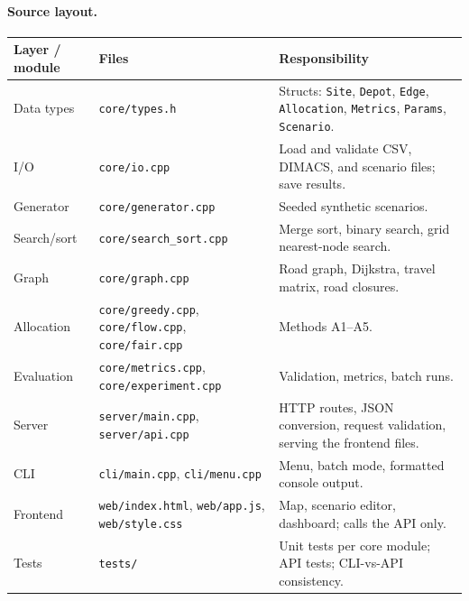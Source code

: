 \documentclass[11pt]{article}
\begin{document}
\paragraph{Source layout.}
\begin{center}
\small
\begin{tabularx}{\textwidth}{@{}l l X@{}}
\toprule
\textbf{Layer / module} & \textbf{Files} & \textbf{Responsibility}\\
\midrule
Data types & \texttt{core/types.h} & Structs: \texttt{Site}, \texttt{Depot}, \texttt{Edge}, \texttt{Allocation}, \texttt{Metrics}, \texttt{Params}, \texttt{Scenario}.\\
I/O & \texttt{core/io.cpp} & Load and validate CSV, DIMACS, and scenario files; save results.\\
Generator & \texttt{core/generator.cpp} & Seeded synthetic scenarios.\\
Search/sort & \texttt{core/search\_sort.cpp} & Merge sort, binary search, grid nearest-node search.\\
Graph & \texttt{core/graph.cpp} & Road graph, Dijkstra, travel matrix, road closures.\\
Allocation & \texttt{core/greedy.cpp}, \texttt{core/flow.cpp}, \texttt{core/fair.cpp} & Methods A1--A5.\\
Evaluation & \texttt{core/metrics.cpp}, \texttt{core/experiment.cpp} & Validation, metrics, batch runs.\\
Server & \texttt{server/main.cpp}, \texttt{server/api.cpp} & HTTP routes, JSON conversion, request validation, serving the frontend files.\\
CLI & \texttt{cli/main.cpp}, \texttt{cli/menu.cpp} & Menu, batch mode, formatted console output.\\
Frontend & \texttt{web/index.html}, \texttt{web/app.js}, \texttt{web/style.css} & Map, scenario editor, dashboard; calls the API only.\\
Tests & \texttt{tests/} & Unit tests per core module; API tests; CLI-vs-API consistency.\\
\bottomrule
\end{tabularx}
\end{center}
\end{document}
